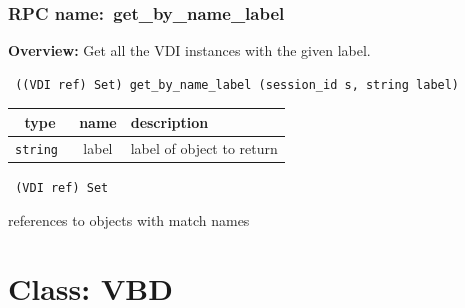 \subsubsection{RPC name:~get\_by\_name\_label}

{\bf Overview:} 
Get all the VDI instances with the given label.

\begin{verbatim} ((VDI ref) Set) get_by_name_label (session_id s, string label)\end{verbatim}



 
\vspace{0.3cm}
\begin{tabular}{|c|c|p{7cm}|}
 \hline
{\bf type} & {\bf name} & {\bf description} \\ \hline
{\tt string } & label & label of object to return \\ \hline 

\end{tabular}

\vspace{0.3cm}

{\tt 
(VDI ref) Set
}


references to objects with match names
\vspace{0.3cm}
\vspace{0.3cm}
\vspace{0.3cm}

\vspace{1cm}
\newpage
\section{Class: VBD}
